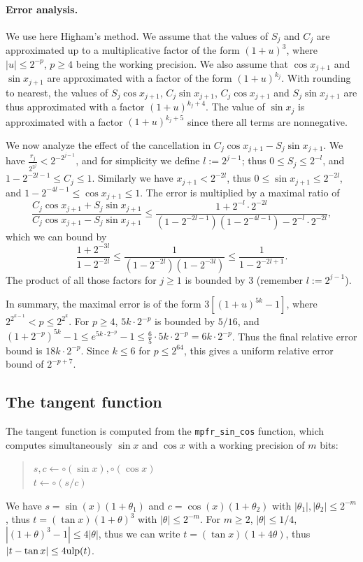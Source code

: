 \documentclass[12pt]{amsart}
\def\ulp{{\rm ulp}}
\begin{document}
\paragraph{Error analysis.}
We use here Higham's method. We assume that the values of $S_j$
and $C_j$ are approximated up to a multiplicative factor of the form
$(1+u)^3$, where $|u| \leq 2^{-p}$, $p \geq 4$ being the working precision.
We also assume that $\cos x_{j+1}$ and $\sin x_{j+1}$ are
approximated with a factor of the form $(1+u)^{k_j}$.
With rounding to nearest, the values of $S_j \cos x_{j+1}$,
$C_j \sin x_{j+1}$, $C_j \cos x_{j+1}$ and $S_j \sin x_{j+1}$ are thus
approximated with a factor $(1+u)^{k_j+4}$.
The value of $\sin x_j$ is approximated with a factor $(1+u)^{k_j+5}$ since
there all terms are nonnegative.

We now analyze the effect of the cancellation in
$C_j \cos x_{j+1} - S_j \sin x_{j+1}$.
We have $\frac{r_j}{2^{2^j}} < 2^{-2^{j-1}}$, and for simplicity we define
$l := 2^{j-1}$;
thus $0 \leq S_j \leq 2^{-l}$, and $1-2^{-2l-1} \leq C_j \leq 1$.
Similarly we have $x_{j+1} < 2^{-2l}$, thus
$0 \leq \sin x_{j+1} \leq 2^{-2l}$, and $1-2^{-4l-1} \leq \cos x_{j+1} \leq 1$.
The error is multiplied by a maximal ratio of
\[ \frac{C_j \cos x_{j+1} + S_j \sin x_{j+1}}
{C_j \cos x_{j+1} - S_j \sin x_{j+1}} \leq
\frac{1+2^{-l} \cdot 2^{-2l}}{(1-2^{-2l-1})(1-2^{-4l-1})-2^{-l} \cdot 2^{-2l}},
\]
which we can bound by
\[ \frac{1+2^{-3l}}{1-2^{-2l}} \leq \frac{1}{(1-2^{-2l})(1-2^{-3l})}
\leq \frac{1}{1-2^{-2l+1}}. \]
The product of all those factors for $j \geq 1$ is bounded by $3$
(remember $l := 2^{j-1}$).

In summary, the maximal error is of the form $3 [(1+u)^{5k}-1]$, where
$2^{2^{k-1}} < p \leq 2^{2^k}$.
For $p \geq 4$, $5k \cdot 2^{-p}$ is bounded by $5/16$, and
$(1+2^{-p})^{5k} - 1 \leq e^{5k \cdot 2^{-p}} - 1 \leq \frac{6}{5}
\cdot 5k \cdot 2^{-p} = 6k \cdot 2^{-p}$.
Thus the final relative error bound is $18k \cdot 2^{-p}$.
Since $k \leq 6$ for $p \leq 2^{64}$, this gives a uniform relative error
bound of $2^{-p+7}$.

\subsection{The tangent function}

The tangent function is computed from the \texttt{mpfr\_sin\_cos} function,
which computes simultaneously $\sin x$ and $\cos x$
with a working precision of $m$ bits:
\begin{quote}
$s, c \leftarrow \circ(\sin x), \circ(\cos x)$ \quad [to nearest] \\
$t \leftarrow \circ(s/c)$ \quad [to nearest] \\
\end{quote}
We have $s = \sin(x) (1 + \theta_1)$ and $c = \cos(x) (1 + \theta_2)$
with $|\theta_1|, |\theta_2| \leq 2^{-m}$, thus
$t = (\tan x) (1 + \theta)^3$ with $|\theta| \leq 2^{-m}$.
For $m \geq 2$, $|\theta| \leq 1/4$,
$|(1 + \theta)^3 - 1| \leq 4 |\theta|$, thus we can write
$t = (\tan x) (1 + 4 \theta)$, thus
$|t - \tan x| \leq 4 \ulp(t)$.
\end{document}
